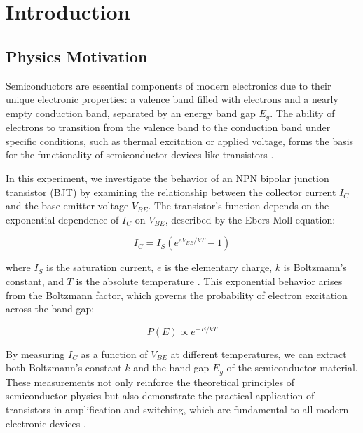 \documentclass[12pt,letterpaper,twocolumn]{article}
\begin{document}

\section{Introduction}

\subsection{Physics Motivation}

Semiconductors are essential components of modern electronics due to their unique electronic properties: a valence band filled with electrons and a nearly empty conduction band, separated by an energy band gap \( E_g \). The ability of electrons to transition from the valence band to the conduction band under specific conditions, such as thermal excitation or applied voltage, forms the basis for the functionality of semiconductor devices like transistors \cite{Thornton}.

In this experiment, we investigate the behavior of an NPN bipolar junction transistor (BJT) by examining the relationship between the collector current \( I_C \) and the base-emitter voltage \( V_{BE} \). The transistor’s function depends on the exponential dependence of \( I_C \) on \( V_{BE} \), described by the Ebers-Moll equation:

\begin{equation}
I_C = I_S \left(e^{eV_{BE}/kT} - 1\right)
\end{equation}

where \( I_S \) is the saturation current, \( e \) is the elementary charge, \( k \) is Boltzmann’s constant, and \( T \) is the absolute temperature \cite{Neudeck}. This exponential behavior arises from the Boltzmann factor, which governs the probability of electron excitation across the band gap:

\begin{equation}
P(E) \propto e^{-E/kT}
\end{equation}

By measuring \( I_C \) as a function of \( V_{BE} \) at different temperatures, we can extract both Boltzmann’s constant \( k \) and the band gap \( E_g \) of the semiconductor material. These measurements not only reinforce the theoretical principles of semiconductor physics but also demonstrate the practical application of transistors in amplification and switching, which are fundamental to all modern electronic devices \cite{Thornton}.
\end{document}
